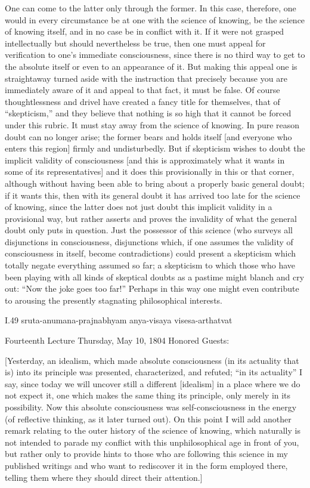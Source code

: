 One can come to the latter only through the former.
In this case, therefore, one would in every circumstance
be at one with the science of knowing,
be the science of knowing itself,
and in no case be in conflict with it.
If it were not grasped intellectually
but should nevertheless be true,
then one must appeal for verification
to one's immediate consciousness,
since there is no third way to get to the absolute itself
or even to an appearance of it.
But making this appeal one is straightaway turned aside
with the instruction that precisely because you are
immediately aware of it and appeal to that fact,
it must be false.
Of course thoughtlessness and drivel have
created a fancy title for themselves,
that of “skepticism,” and they believe that nothing is
so high that it cannot be forced under this rubric.
It must stay away from the science of knowing.
In pure reason doubt can no longer arise;
the former bears and holds itself
[and everyone who enters this region]
firmly and undisturbedly.
But if skepticism wishes to doubt
the implicit validity of consciousness
[and this is approximately what it
wants in some of its representatives]
and it does this provisionally in this or that corner,
although without having been able to bring about
a properly basic general doubt;
if it wants this, then with its general doubt
it has arrived too late for the science of knowing,
since the latter does not just doubt
this implicit validity in a provisional way,
but rather asserts and proves the invalidity of
what the general doubt only puts in question.
Just the possessor of this science
(who surveys all disjunctions in consciousness,
disjunctions which, if one assumes the validity
of consciousness in itself, become contradictions)
could present a skepticism which totally negate
everything assumed so far;
a skepticism to which those who have been playing
with all kinds of skeptical doubts as a pastime
might blanch and cry out: “Now the joke goes too far!”
Perhaps in this way one might even contribute
to arousing the presently stagnating philosophical interests.

I.49
sruta-anumana-prajnabhyam anya-visaya visesa-arthatvat

Fourteenth Lecture
Thursday, May 10, 1804
Honored Guests:

[Yesterday, an idealism, which made absolute consciousness
(in its actuality that is) into its principle was
presented, characterized, and refuted;
“in its actuality” I say,
since today we will uncover still
a different [idealism] in a place
where we do not expect it,
one which makes the same thing its principle,
only merely in its possibility.
Now this absolute consciousness was self-consciousness
in the energy (of reflective thinking, as it later turned out).
On this point I will add another remark
relating to the outer history of the science of knowing,
which naturally is not intended to parade my conflict
with this unphilosophical age in front of you,
but rather only to provide hints to those
who are following this science in my published writings
and who want to rediscover it in the form employed there,
telling them where they should direct their attention.]

